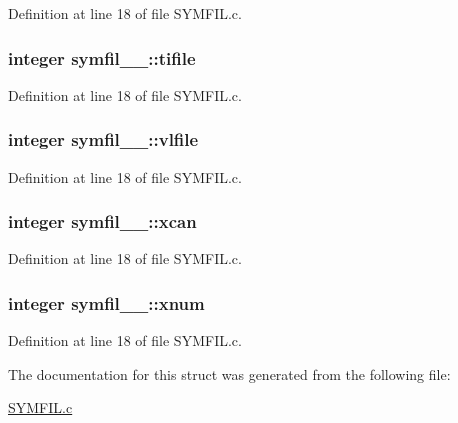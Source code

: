 Definition at line 18 of file S\+Y\+M\+F\+I\+L.\+c.

\subsubsection[{\texorpdfstring{tifile}{tifile}}]{\setlength{\rightskip}{0pt plus 5cm}integer symfil\+\_\+\_\+\+::tifile}\hypertarget{structsymfil__1___acbf3582bafc9b5d4cce43c942c382a50}{}\label{structsymfil__1___acbf3582bafc9b5d4cce43c942c382a50}


Definition at line 18 of file S\+Y\+M\+F\+I\+L.\+c.

\subsubsection[{\texorpdfstring{vlfile}{vlfile}}]{\setlength{\rightskip}{0pt plus 5cm}integer symfil\+\_\+\_\+\+::vlfile}\hypertarget{structsymfil__1___ae403807e27289feefc8d1bdd4f100695}{}\label{structsymfil__1___ae403807e27289feefc8d1bdd4f100695}


Definition at line 18 of file S\+Y\+M\+F\+I\+L.\+c.

\subsubsection[{\texorpdfstring{xcan}{xcan}}]{\setlength{\rightskip}{0pt plus 5cm}integer symfil\+\_\+\_\+\+::xcan}\hypertarget{structsymfil__1___a5bc6b255c4391a8934cafbfaa97be315}{}\label{structsymfil__1___a5bc6b255c4391a8934cafbfaa97be315}


Definition at line 18 of file S\+Y\+M\+F\+I\+L.\+c.

\subsubsection[{\texorpdfstring{xnum}{xnum}}]{\setlength{\rightskip}{0pt plus 5cm}integer symfil\+\_\+\_\+\+::xnum}\hypertarget{structsymfil__1___aaae2bbdc122a638a3729362e02678968}{}\label{structsymfil__1___aaae2bbdc122a638a3729362e02678968}


Definition at line 18 of file S\+Y\+M\+F\+I\+L.\+c.



The documentation for this struct was generated from the following file\+:\begin{DoxyCompactItemize}
\item 
\hyperlink{SYMFIL_8c}{S\+Y\+M\+F\+I\+L.\+c}\end{DoxyCompactItemize}
